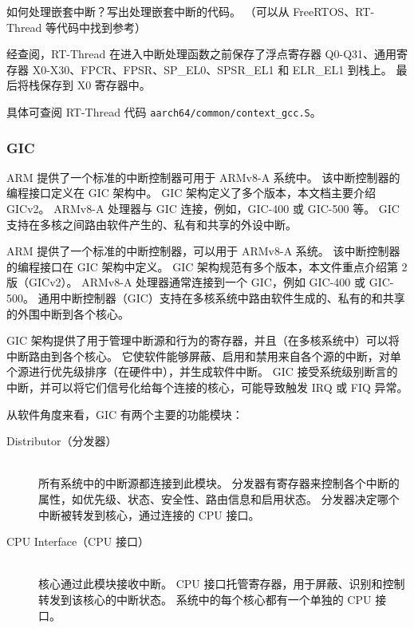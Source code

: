 \begin{probsolu}[title={Problem and Solution \theprob}]{
  如何处理嵌套中断？写出处理嵌套中断的代码。
（可以从 FreeRTOS、RT-Thread 等代码中找到参考）
  }\label{pb:how-to-hdl-nest-irqs}

  经查阅，RT-Thread 在进入中断处理函数之前保存了浮点寄存器 Q0-Q31、通用寄存器 X0-X30、FPCR、FPSR、SP\_EL0、SPSR\_EL1 和 ELR\_EL1 到栈上。
  最后将栈保存到 X0 寄存器中。

  具体可查阅 RT-Thread 代码 \lstinline!aarch64/common/context_gcc.S!。
\end{probsolu}

\subsubsection{GIC} \label{sec:gic}

ARM 提供了一个标准的中断控制器可用于 ARMv8-A 系统中。
该中断控制器的编程接口定义在 GIC 架构中。
GIC 架构定义了多个版本，本文档主要介绍 GICv2。
ARMv8-A 处理器与 GIC 连接，例如，GIC-400 或 GIC-500 等。
GIC 支持在多核之间路由软件产生的、私有和共享的外设中断。


ARM 提供了一个标准的中断控制器，可以用于 ARMv8-A 系统。
该中断控制器的编程接口在 GIC 架构中定义。
GIC 架构规范有多个版本，本文件重点介绍第 2 版（GICv2）。
ARMv8-A 处理器通常连接到一个 GIC，例如 GIC-400 或 GIC-500。
通用中断控制器（GIC）支持在多核系统中路由软件生成的、私有的和共享的外围中断到各个核心。

GIC 架构提供了用于管理中断源和行为的寄存器，并且（在多核系统中）可以将中断路由到各个核心。
它使软件能够屏蔽、启用和禁用来自各个源的中断，对单个源进行优先级排序（在硬件中），并生成软件中断。
GIC 接受系统级别断言的中断，并可以将它们信号化给每个连接的核心，可能导致触发 IRQ 或 FIQ 异常。

从软件角度来看，GIC 有两个主要的功能模块：

\begin{description}
  \item[{Distributor（分发器）}] \hfill \\
    所有系统中的中断源都连接到此模块。
    分发器有寄存器来控制各个中断的属性，如优先级、状态、安全性、路由信息和启用状态。
    分发器决定哪个中断被转发到核心，通过连接的
    CPU 接口。
  \item[{CPU Interface（CPU 接口）}] \hfill \\
    核心通过此模块接收中断。
    CPU 接口托管寄存器，用于屏蔽、识别和控制转发到该核心的中断状态。
    系统中的每个核心都有一个单独的 CPU 接口。
\end{description}

